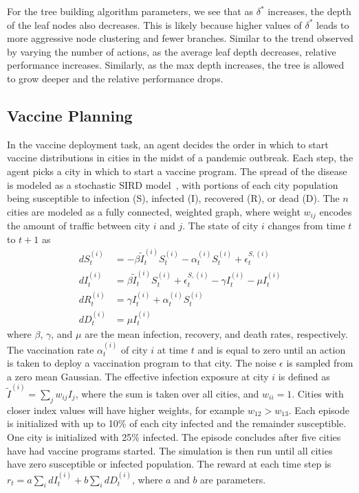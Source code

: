 \documentclass[letterpaper]{article} %
\begin{document}
For the tree building algorithm parameters, we see that as $\delta^*$ increases, the depth of the leaf nodes also decreases.
This is likely because higher values of $\delta^*$ leads to more aggressive node clustering and fewer branches.
Similar to the trend observed by varying the number of actions, as the average leaf depth decreases, relative performance increases.
Similarly, as the max depth increases, the tree is allowed to grow deeper and the relative performance drops.

\subsection{Vaccine Planning}
In the vaccine deployment task, an agent decides the order in which to start vaccine distributions in cities in the midst of a pandemic outbreak.
Each step, the agent picks a city in which to start a vaccine program.
The spread of the disease is modeled as a stochastic SIRD model~\cite{bailey1975}, with portions of each city population being susceptible to infection (S), infected (I), recovered (R), or dead (D).
The $n$ cities are modeled as a fully connected, weighted graph, where weight $w_{ij}$ encodes the amount of traffic between city $i$ and $j$.
The state of city $i$ changes from time $t$ to $t+1$ as
\begin{align}
dS^{(i)}_{t} &= -\beta \tilde{I}^{(i)}_t S^{(i)}_t - \alpha^{(i)}_t S^{(i)}_t +\epsilon^{S, (i)}_t \\
dI^{(i)}_{t} &= \beta \tilde{I}^{(i)}_t S^{(i)}_t +\epsilon^{S, (i)}_t - \gamma I^{(i)}_t - \mu I^{(i)}_t \\
dR^{(i)}_{t} &= \gamma I^{(i)}_t + \alpha^{(i)}_t S^{(i)}_t \\
dD^{(i)}_{t} &= \mu I^{(i)}_t
\end{align}  where $\beta$, $\gamma$, and $\mu$ are the mean infection, recovery, and death rates, respectively.
The vaccination rate $\alpha^{(i)}_{t}$ of city $i$ at time $t$ and is equal to zero until an action is taken to deploy a vaccination program to that city.
The noise $\epsilon$ is sampled from a zero mean Gaussian.
The effective infection exposure at city $i$ is defined as $\tilde{I}^{(i)} = \sum_j w_{ij}I_j$, where the sum is taken over all cities, and $w_{ii} = 1$.
Cities with closer index values will have higher weights, for example $w_{12} > w_{13}$.  Each episode is initialized with up to 10\% of each city infected and the remainder susceptible.
One city is initialized with 25\% infected.
The episode concludes after five cities have had vaccine programs started.
The simulation is then run until all cities have zero susceptible or infected population.
The reward at each time step is $ r_t = a \sum_i dI^{(i)}_t + b \sum_i dD^{(i)}_t $, where $a$ and $b$ are parameters.
\end{document}
